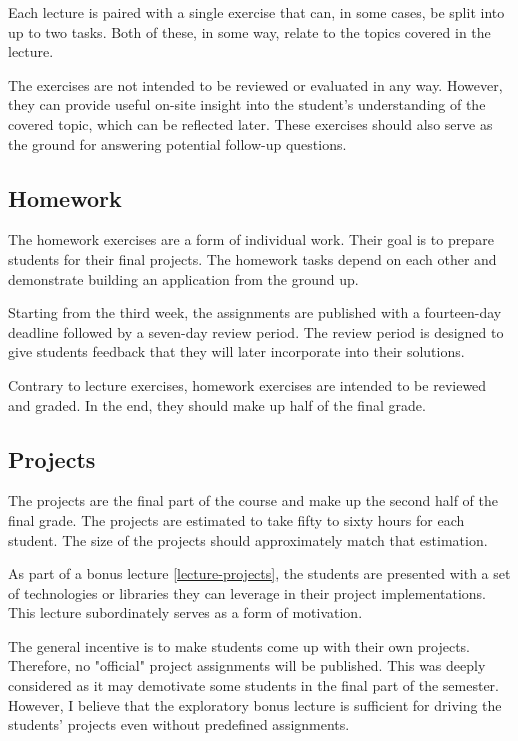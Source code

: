 \documentclass[
  digital,
  color,
  oneside,
  nosansbold,
  nocolorbold,
  lof,
  lot,
]{fithesis4}
\begin{document}
Each lecture is paired with a single exercise that can, in some cases, be split into up to two tasks. Both of these, in some way, relate to the topics covered in the lecture.

The exercises are not intended to be reviewed or evaluated in any way. However, they can provide useful on-site insight into the student's understanding of the covered topic, which can be reflected later. These exercises should also serve as the ground for answering potential follow-up questions.

\subsection{Homework}

The homework exercises are a form of individual work. Their goal is to prepare students for their final projects. The homework tasks depend on each other and demonstrate building an application from the ground up.

Starting from the third week, the assignments are published with a fourteen-day deadline followed by a seven-day review period. The review period is designed to give students feedback that they will later incorporate into their solutions.

Contrary to lecture exercises, homework exercises are intended to be reviewed and graded. In the end, they should make up half of the final grade.

\subsection{Projects}

The projects are the final part of the course and make up the second half of the final grade. The projects are estimated to take fifty to sixty hours for each student. The size of the projects should approximately match that estimation.

As part of a bonus lecture \ref{lecture-projects}, the students are presented with a set of technologies or libraries they can leverage in their project implementations. This lecture subordinately serves as a form of motivation.

The general incentive is to make students come up with their own projects. Therefore, no "official" project assignments will be published. This was deeply considered as it may demotivate some students in the final part of the semester. However, I believe that the exploratory bonus lecture is sufficient for driving the students' projects even without predefined assignments.
\end{document}
